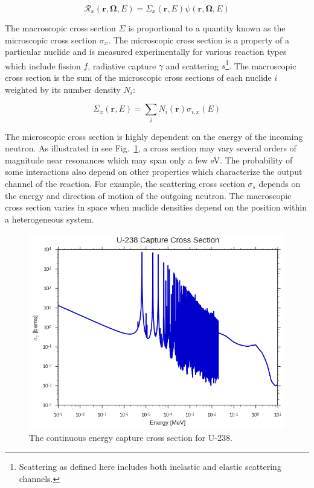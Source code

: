 \begin{dmath}
\label{eqn:chap2-rxn-rates}
\mathcal{R}_{x}(\mathbf{r},\mathbf{\Omega},E) = \Sigma_{x}(\mathbf{r},E) \psi(\mathbf{r},\mathbf{\Omega},E)
\end{dmath}

\noindent The macroscopic cross section $\Sigma$ is proportional to a quantity known as the microscopic cross section $\sigma_{x}$. The microscopic cross section is a property of a particular nuclide and is measured experimentally for various reaction types which include fission $f$, radiative capture $\gamma$ and scattering $s$\footnote{Scattering as defined here includes both inelastic and elastic scattering channels.}. The macroscopic cross section is the sum of the microscopic cross sections of each nuclide $i$ weighted by its number density $N_{i}$:

\begin{dmath}
\label{eqn:chap2-macro-xs-sum}
\Sigma_{x}(\mathbf{r},E) = \sum_{i}N_{i}(\mathbf{r})\sigma_{i,x}(E)
\end{dmath}

The microscopic cross section is highly dependent on the energy of the incoming neutron. As illustrated in see Fig.~\ref{fig:chap2-u238-xs}, a cross section may vary several orders of magnitude near resonances which may span only a few eV. The probability of some interactions also depend on other properties which characterize the output channel of the reaction. For example, the scattering cross section $\sigma_{s}$ depends on the energy and direction of motion of the outgoing neutron. The macroscopic cross section varies in space when nuclide densities depend on the position within a heterogeneous system.

\begin{figure}[H]
  \centering
  \includegraphics[width=0.8\linewidth]{figures/mgxs/u238-capture-xs}
\caption[U-238 capture cross section]{The continuous energy capture cross section for U-238.}
\label{fig:chap2-u238-xs}
\end{figure}
 
